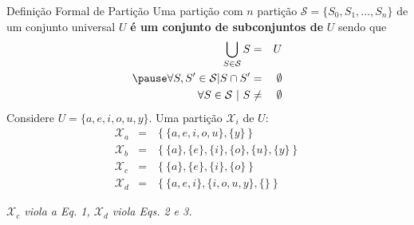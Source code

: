     \begin{frame}{Definição Formal de Partição}
        Uma partição com $n$ partição $ \mathcal{S} = \{S_0, S_1, \dots, S_n\} $ de um conjunto universal $ U $ \textbf{é um conjunto de subconjuntos de} $ U $ sendo que
        \begin{eqnarray}
        \bigcup_{S \in \mathcal{S}} S &=& U \\ \pause
        \forall S, S' \in \mathcal{S} | S \cap S' &=& \emptyset \\
        \forall S \in \mathcal{S}\ |\ S &\neq& \emptyset
        \end{eqnarray}
        \pause
        Considere $ U = \{a, e, i, o, u, y\} $. Uma partição $ \mathcal{X}_i $ de $ U $:
        \begin{eqnarray}
        \mathcal{X}_a &=& \left\{\{a, e, i, o, u\}, \{y\}\right\} \label{eq:xa} \\
        \mathcal{X}_b &=& \left\{\{a\}, \{e\}, \{i\}, \{o\}, \{u\}, \{y\}\right\} \label{eq:part_a} \\
        \mathcal{X}_c &=& \left\{\{a\}, \{e\}, \{i\}, \{o\} \right\} \label{eq:part_c} \\
        \mathcal{X}_d &=& \left\{\{a, e, i\}, \{i, o, u, y\}, \{\}\right\} \label{eq:part_d}
        \end{eqnarray}
        
        \textit{$\mathcal{X}_c$ viola a Eq. 1, $\mathcal{X}_d$ viola Eqs. 2 e 3.}
        
    \end{frame}
   
   
   
